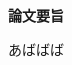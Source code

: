 \documentclass[Main]{subfiles}
\begin{document}
\thispagestyle{empty}
\begin{center}
    {\Huge \textbf{論文要旨}}
\end{center}
\vspace{0.5cm}

あばばば

\newpage
\end{document}
